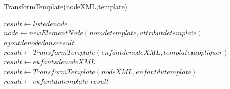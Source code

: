 \begin{algorithm}
\caption{TransformTemplate(nodeXML,template)}
\begin{algorithmic}
\STATE $result \leftarrow liste de node$
\STATE $node \leftarrow new ElementNode(nom de template,attribut de template)$
\STATE $ajout de node dans result$
\ENDIF
{}
\STATE $result \leftarrow TransformTemplate(enfant de nodeXML,template à appliquer)$
\ENDIF
{}
\STATE $result \leftarrow enfants de nodeXML$
\ENDIF
\ELSE
\STATE $result \leftarrow TransformTemplate(nodeXML,enfant du template)$
\ENDIF
\ELSE
\STATE $result \leftarrow enfant du template$
\ENDIF
\ENDFOR
\RETURN $result$
\end{algorithmic}
\end{algorithm}

